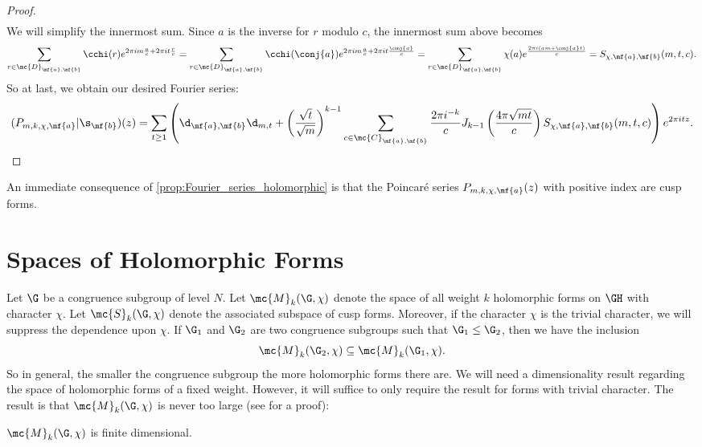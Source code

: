 \begin{proof}
\begin{align*}
      \end{align*}
      We will simplify the innermost sum. Since $a$ is the inverse for $r$ modulo $c$, the innermost sum above becomes
      \[
        \sum_{r \in \mc{D}_{\mf{a},\mf{b}}}\cchi(r)e^{2\pi im\frac{a}{c}+2\pi it\frac{r}{c}} = \sum_{r \in \mc{D}_{\mf{a},\mf{b}}}\cchi(\conj{a})e^{2\pi im\frac{a}{c}+2\pi it\frac{\conj{a}}{c}} = \sum_{r \in \mc{D}_{\mf{a},\mf{b}}}\chi(a)e^{\frac{2\pi i(am+\conj{a}t)}{c}} = S_{\chi,\mf{a},\mf{b}}(m,t,c).
      \]
      So at last, we obtain our desired Fourier series:
      \[
        (P_{m,k,\chi,\mf{a}}|\s_{\mf{b}})(z) = \sum_{t \ge 1}\left(\d_{\mf{a},\mf{b}}\d_{m,t}+\left(\frac{\sqrt{t}}{\sqrt{m}}\right)^{k-1}\sum_{\substack{c \in \mc{C}_{\mf{a},\mf{b}}}}\frac{2\pi i^{-k}}{c}J_{k-1}\left(\frac{4\pi\sqrt{mt}}{c}\right)S_{\chi,\mf{a},\mf{b}}(m,t,c)\right)e^{2\pi itz}.
      \]
    \end{proof}

    An immediate consequence of \cref{prop:Fourier_series_holomorphic} is that the Poincar\'e series $P_{m,k,\chi,\mf{a}}(z)$ with positive index are cusp forms.
  \section{Spaces of Holomorphic Forms}
    Let $\G$ be a congruence subgroup of level $N$. Let $\mc{M}_{k}(\G,\chi)$ denote the space of all weight $k$ holomorphic forms on $\GH$ with character $\chi$. Let $\mc{S}_{k}(\G,\chi)$ denote the associated subspace of cusp forms. Moreover, if the character $\chi$ is the trivial character, we will suppress the dependence upon $\chi$. If $\G_{1}$ and $\G_{2}$ are two congruence subgroups such that $\G_{1} \le \G_{2}$, then we have the inclusion
    \[
      \mc{M}_{k}(\G_{2},\chi) \subseteq \mc{M}_{k}(\G_{1},\chi).
    \]
    So in general, the smaller the congruence subgroup the more holomorphic forms there are. We will need a dimensionality result regarding the space of holomorphic forms of a fixed weight. However, it will suffice to only require the result for forms with trivial character. The result is that $\mc{M}_{k}(\G,\chi)$ is never too large (see \cite{diamond2005first} for a proof):

    \begin{theorem}\label{thm:modular_forms_space_classification}
      $\mc{M}_{k}(\G,\chi)$ is finite dimensional.
    \end{theorem}

